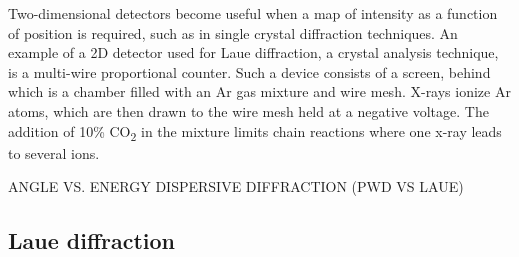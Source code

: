 Two-dimensional detectors become useful when a map of intensity as a function of position is required, such as in single crystal diffraction techniques. An example of a 2D detector used for Laue diffraction, a crystal analysis technique, is a multi-wire proportional counter. Such a device consists of a screen, behind which is a chamber filled with an Ar gas mixture and wire mesh. X-rays ionize Ar atoms, which are then drawn to the wire mesh held at a negative voltage. The addition of 10\% CO\textsubscript{2} in the mixture limits chain reactions where one x-ray leads to several ions.

ANGLE VS. ENERGY DISPERSIVE DIFFRACTION (PWD VS LAUE)
\subsection{Laue diffraction}
